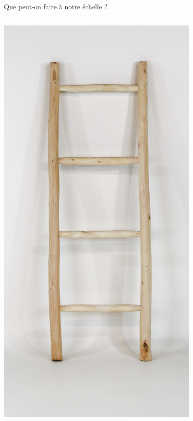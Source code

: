 \documentclass[10pt,table,dvipsnames,compress]{beamer}
\begin{document}
\begin{frame}[label={sec:org42073c0}]{Que peut-on faire à notre échelle ?}
\begin{columns}
\begin{column}{0.3\columnwidth}
\begin{center}
\includegraphics[width=\textwidth]{figs/echelle.jpg}
\end{center}
\end{column}
\end{columns}
\end{frame}
\end{document}
